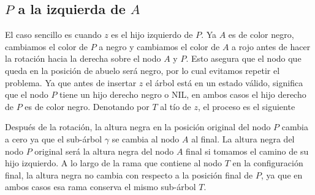 \documentclass[10pt,a4paper]{article}
\begin{document}
\subsection*{$P$ a la izquierda de $A$}
El caso sencillo es cuando $z$ es el hijo izquierdo de $P$. Ya $A$ es de color negro, cambiamos el color de $P$ a negro y cambiamos el color de $A$ a rojo antes de hacer la rotaci\'on hacia la derecha sobre el nodo $A$ y $P$. Esto asegura que el nodo que queda en la posici\'on de abuelo ser\'a negro, por lo cual evitamos repetir el problema. Ya que antes de insertar $z$ el \'arbol est\'a en un estado v\'alido, significa que el nodo $P$ tiene un hijo derecho negro o NIL, en ambos casos el hijo derecho de $P$ es de color negro. Denotando por $T$ al t\'io de $z$, el proceso es el siguiente \newline 

\hspace{1cm}
\hspace{1cm}
\vspace{1cm}

Despu\'es de la rotaci\'on, la altura negra en la posici\'on original del nodo $P$ cambia a cero ya que el sub-\'arbol $\gamma$ se cambia al nodo $A$ al final. La altura negra del nodo $P$ original ser\'a la altura negra del nodo $A$ final si tomamos el camino de su hijo izquierdo. A lo largo de la rama que contiene al nodo $T$ en la configuraci\'on final, la altura negra no cambia con respecto a la posici\'on final de $P$, ya que en ambos casos esa rama conserva el mismo sub-\'arbol $T$.\newline 
\end{document}
